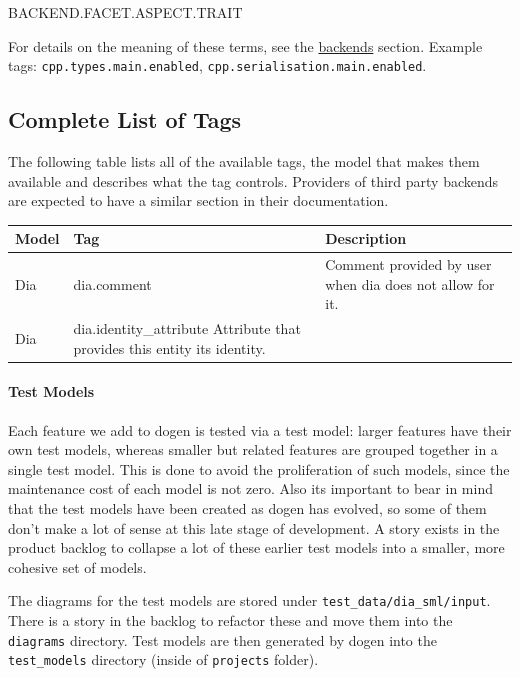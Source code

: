 \documentclass{book}
\begin{document}
\begin{pseudocode}[backgroundcolor=\color{lightgray}]
BACKEND.FACET.ASPECT.TRAIT
\end{pseudocode}

For details on the meaning of these terms, see the
\href{https://github.com/DomainDrivenConsulting/dogen/blob/master/doc/manual/manual.org#the-backends}{backends}
section. Example tags: \texttt{cpp.types.main.enabled},
\texttt{cpp.serialisation.main.enabled}.

\subsection{Complete List of Tags}

The following table lists all of the available tags, the model that
makes them available and describes what the tag controls. Providers of
third party backends are expected to have a similar section in their
documentation.

\begin{center}
\begin{tabular}{lll}
Model & Tag & Description\\
\hline
Dia & dia.comment & Comment provided by user when dia does not allow for it.\\
Dia & dia.identity\_attribute Attribute that provides this entity its identity.\\
\end{tabular}
\end{center}

\paragraph{Test Models}

Each feature we add to dogen is tested via a test model: larger
features have their own test models, whereas smaller but related
features are grouped together in a single test model. This is done to
avoid the proliferation of such models, since the maintenance cost of
each model is not zero. Also its important to bear in mind that the
test models have been created as dogen has evolved, so some of them
don't make a lot of sense at this late stage of development. A story
exists in the product backlog to collapse a lot of these earlier test
models into a smaller, more cohesive set of models.

The diagrams for the test models are stored under
\texttt{test\_data/dia\_sml/input}. There is a story in the backlog to
refactor these and move them into the \texttt{diagrams}
directory. Test models are then generated by dogen into the
\texttt{test\_models} directory (inside of \texttt{projects} folder).
\end{document}
